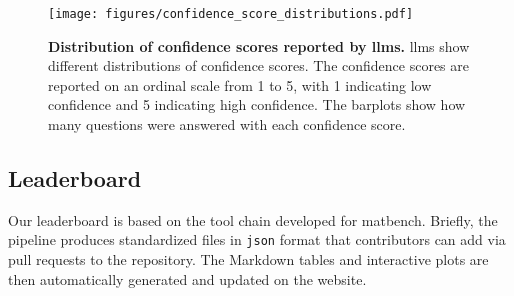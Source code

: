 \begin{figure}[htb] 
    \centering
    \texttt{[image: figures/confidence\_score\_distributions.pdf]}
    \caption{\textbf{Distribution of confidence scores reported by \glspl{llm}.} \Glspl{llm} show different distributions of confidence scores. The confidence scores are reported on an ordinal scale from 1 to 5, with 1 indicating low confidence and 5 indicating high confidence. The barplots show how many questions were answered with each confidence score.}
    \label{fig:confidence_score_distributions}
\end{figure}


\subsection{Leaderboard}
Our leaderboard is based on the tool chain developed for matbench.\autocite{Dunn_2020} 
Briefly, the \chembench pipeline produces standardized files in \texttt{json} format that contributors can add via pull requests to the \chembench repository.
The Markdown tables and interactive plots are then automatically generated and updated on the \chembench website.

\clearpage

\printnoidxglossary[type=\acronymtype, nonumberlist]  %